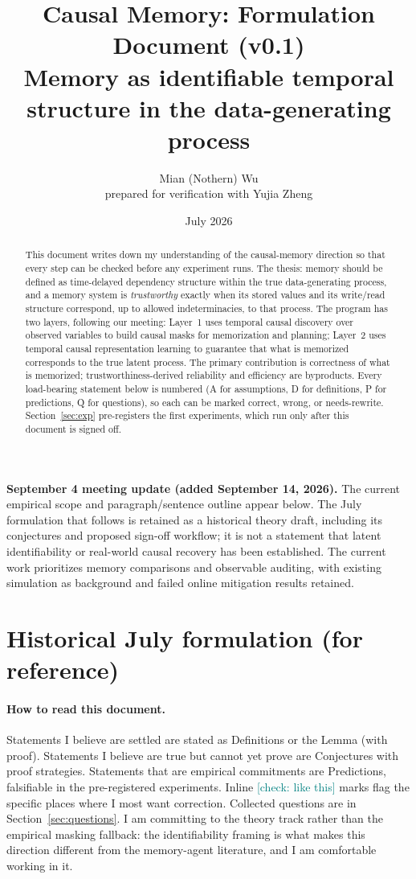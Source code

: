 \documentclass[11pt]{article}
\title{\textbf{Causal Memory: Formulation Document (v0.1)}\\[2mm]
\large Memory as identifiable temporal structure in the data-generating process}
\author{Mian (Nothern) Wu \\ \small prepared for verification with Yujia Zheng}
\date{July 2026}
\newcommand{\checkY}[1]{\textcolor{teal}{\footnotesize [check: #1]}}
\theoremstyle{plain}
\theoremstyle{definition}
\begin{document}
\maketitle

\noindent\textbf{September 4 meeting update (added September 14, 2026).}
The current empirical scope and paragraph/sentence outline appear below. The
July formulation that follows is retained as a historical theory draft, including
its conjectures and proposed sign-off workflow; it is not a statement that latent
identifiability or real-world causal recovery has been established. The current
work prioritizes memory comparisons and observable auditing, with existing
simulation as background and failed online mitigation results retained.

\clearpage
\section*{Historical July formulation (for reference)}

\begin{abstract}
\noindent This document writes down my understanding of the causal-memory direction so that every step can be checked before any experiment runs. The thesis: memory should be defined as time-delayed dependency structure within the true data-generating process, and a memory system is \emph{trustworthy} exactly when its stored values and its write/read structure correspond, up to allowed indeterminacies, to that process. The program has two layers, following our meeting: Layer~1 uses temporal causal discovery over observed variables to build causal masks for memorization and planning; Layer~2 uses temporal causal representation learning to guarantee that what is memorized corresponds to the true latent process. The primary contribution is correctness of what is memorized; trustworthiness-derived reliability and efficiency are byproducts. Every load-bearing statement below is numbered (A for assumptions, D for definitions, P for predictions, Q for questions), so each can be marked correct, wrong, or needs-rewrite. Section~\ref{sec:exp} pre-registers the first experiments, which run only after this document is signed off.
\end{abstract}

\paragraph{How to read this document.} Statements I believe are settled are stated as Definitions or the Lemma (with proof). Statements I believe are true but cannot yet prove are Conjectures with proof strategies. Statements that are empirical commitments are Predictions, falsifiable in the pre-registered experiments. Inline \checkY{like this} marks flag the specific places where I most want correction. Collected questions are in Section~\ref{sec:questions}. I am committing to the theory track rather than the empirical masking fallback: the identifiability framing is what makes this direction different from the memory-agent literature, and I am comfortable working in it.
\end{document}
